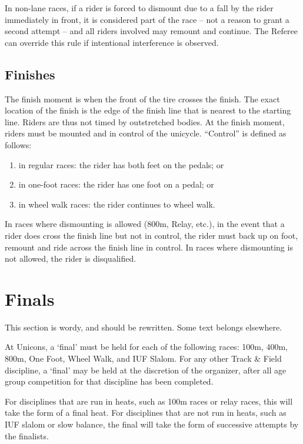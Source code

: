 In non-lane races, if a rider is forced to dismount due to a fall by the rider immediately in front, it is considered part of the race -- not a reason to grant a second attempt -- and all riders involved may remount and continue.
The Referee can override this rule if intentional interference is observed.

\subsection{Finishes \label{sec:track-field_finishes}}

The finish moment is when the front of the tire crosses the finish.
The exact location of the finish is the edge of the finish line that is nearest to the starting line.
Riders are thus not timed by outstretched bodies.
At the finish moment, riders must be mounted and in control of the unicycle.
``Control'' is defined as follows:
\begin{enumerate}[label=(\alph*)]
\item in regular races: the rider has both feet on the pedals; or
\item in one-foot races: the rider has one foot on a pedal; or
\item in wheel walk races: the rider continues to wheel walk.
\end{enumerate}
In races where dismounting is allowed (800m, Relay, etc.\@), in the event that a rider does cross the finish line but not in control, the rider must back up on foot, remount and ride across the finish line in control.
In races where dismounting is not allowed, the rider is disqualified.

\section{Finals}

\begin{comment2016}
This section is wordy, and should be rewritten.
Some text belongs elsewhere.
\end{comment2016}

At Unicons, a `final' must be held for each of the following races: 100m, 400m, 800m, One Foot, Wheel Walk, and IUF Slalom.
For any other Track \& Field discipline, a `final' may be held at the discretion of the organizer, after all age group competition for that discipline has been completed.

For disciplines that are run in heats, such as 100m races or relay races, this will take the form of a final heat.
For disciplines that are not run in heats, such as IUF slalom or slow balance, the final will take the form of successive attempts by the finalists.

